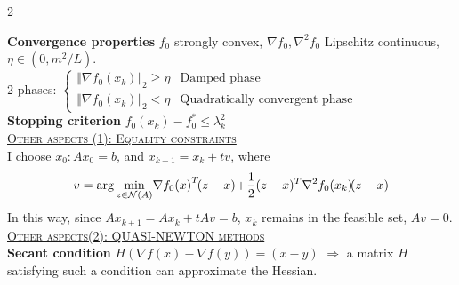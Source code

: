 \documentclass[a4paper]{article}
\begin{document}
\begin{multicols}{2}
\begin{algorithm}[H]
\begin{algorithmic}[1]
            \EndWhile
        \end{algorithmic}
     \end{algorithm}
     \vspace{-0.5cm}
     \noindent
     \textbf{Convergence properties} $f_0$ strongly convex, $\nabla{f_0}, \nabla^2{f_0}$ Lipschitz continuous, $\eta \in (0, m^2/L)$. \\
     2 phases:
     $\begin{cases}
        \Vert \nabla{f_0(x_k)} \Vert_2 \ge \eta&\text{Damped phase}\\
        \Vert \nabla{f_0(x_k)} \Vert_2 < \eta&\text{Quadratically convergent phase}
     \end{cases}$\\
     \textbf{Stopping criterion} $f_0(x_k) - f_0^* \le \lambda_k^2$\\
     \textsc{\underline{Other aspects (1): Equality constraints}}\\
     I choose $x_0: Ax_0=b$, and $x_{k+1}=x_k+tv$, where
     \vspace{-0.2cm}
     \begin{equation*}
        \small
        v=\arg\min_{z\in\mathcal{N}(A)} {\!\nabla{f_0(x)}^T\!(z-x)\!+\!\frac{1}{2}(z-x)^T\nabla^2{f_0(x_k)}\!(z-x)}
     \end{equation*}
     In this way, since $A{x_{k+1}}=A{x_{k}}+tAv=b$, $x_k$ remains in the feasible set, $Av=0$.\\
     \noindent
     \textsc{\underline{Other aspects(2): QUASI-NEWTON methods}} \\
     \textbf{Secant condition} $H(\nabla{f(x)}-\nabla{f(y)})=(x-y)$ $\Rightarrow$ a matrix $H$ satisfying such a condition can approximate the Hessian.

     \begin{algorithm}[H]
        \caption{Quasi-Newton methods}
        \begin{algorithmic}[1]

        \end{algorithmic}
     \end{algorithm}
     
\end{multicols}
\end{document}
